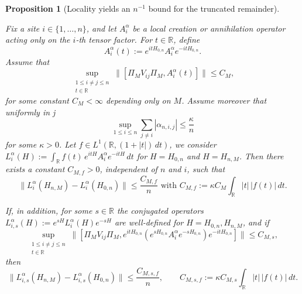 \documentclass[11pt]{amsart}
\newcommand{\1}{\mathbbm{1}}
\theoremstyle{plain}
\newtheorem{proposition}[theorem]{Proposition}
\theoremstyle{definition}
\theoremstyle{remark}
\numberwithin{equation}{section}
\begin{document}
\begin{proposition}[Locality yields an \(n^{-1}\) bound for the truncated remainder]
\label{prop:locality-remainder-1overn}

Fix a site \(i\in\{1,\dots,n\}\), and let \(A_i^\alpha\) be a local creation or annihilation operator acting only on the \(i\)-th tensor factor. For \(t\in\mathbb R\), define
\[
A_i^\alpha(t):=e^{itH_{0,n}}A_i^\alpha e^{-itH_{0,n}}.
\]
Assume that
\begin{equation}
\label{eq:uniform-local-commutator-bound}
\sup_{\substack{1\le i\neq j\le n\\ t\in\mathbb R}}
\big\|[\Pi_MV_{ij}\Pi_M,A_i^\alpha(t)]\big\|
\le C_M,
\end{equation}
for some constant \(C_M<\infty\) depending only on \(M\). Assume moreover that uniformly in j
\begin{equation}
\label{eq:mean-field-row-sum}
\sup_{1\le i\le n}\sum_{j\neq i}|\alpha_{n,i,j}|
\le \frac{\kappa}{n}
\end{equation}
for some \(\kappa>0\). Let \(f\in L^1(\mathbb R,(1+|t|)\,dt)\), we consider $L^\alpha_i(H):=\int_{\mathbb R} f(t)\,e^{itH}A_i^\alpha e^{-itH}\,dt$
for \(H=H_{0,n}\) and \(H=H_{n,M}\). Then there exists a constant \(C_{M,f}>0\), independent of \(n\) and \(i\), such that
\[
\big\|L_i^\alpha(H_{n,M})-L_i^\alpha(H_{0,n})\big\|
\le \frac{C_{M,f}}{n} \text{ with }C_{M,f}:=\kappa C_M \int_{\mathbb R}|t|\,|f(t)|\,dt.
\]

If, in addition, for some \(s\in\mathbb R\) the conjugated operators $L_{i,s}^\alpha(H):=e^{sH}L_i^\alpha(H)e^{-sH}$
are well-defined for \(H=H_{0,n},H_{n,M}\), and if
\begin{equation}
\label{eq:uniform-local-commutator-bound-conjugated}
\sup_{\substack{ 1\le i\neq j\le n\\ t\in\mathbb R}}
\big\|[\Pi_MV_{ij}\Pi_M,e^{itH_{0,n}}(e^{sH_{0,n}}A_i^\alpha e^{-sH_{0,n}})e^{-itH_{0,n}}]\big\|
\le C_{M,s},
\end{equation}
then
\[
\big\|L_{i,s}^\alpha(H_{n,M})-L_{i,s}^\alpha(H_{0,n})\big\|
\le \frac{C_{M,s,f}}{n},
\qquad
C_{M,s,f}:=\kappa C_{M,s}\int_{\mathbb R}|t|\,|f(t)|\,dt.
\]
\end{proposition}
\end{document}
